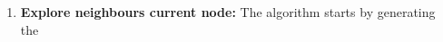 \begin{enumerate}

\item \textbf{Explore neighbours current node:} The algorithm starts by generating the                                                                                                      
\end{enumerate}